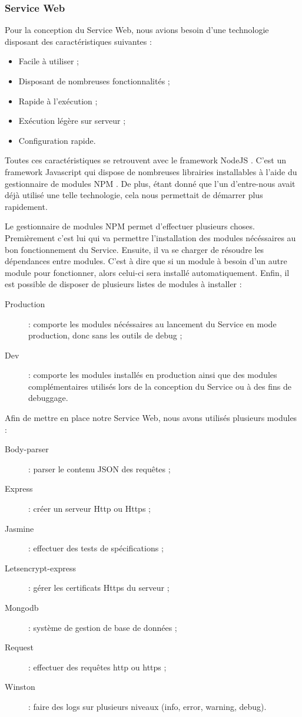 \subsubsection{Service Web}

Pour la conception du Service Web, nous avions besoin d'une technologie disposant des caractéristiques suivantes :
\begin{itemize}
    \item Facile à utiliser ;
    \item Disposant de nombreuses fonctionnalités ;
    \item Rapide à l'exécution ;
    \item Exécution légère sur serveur ;
    \item Configuration rapide.
\end{itemize}

Toutes ces caractéristiques se retrouvent avec le framework NodeJS \cite{nodejs}. C'est un framework Javascript qui dispose de nombreuses librairies installables à l'aide du gestionnaire de modules NPM \cite{npmjs}. De plus, étant donné que l'un d'entre-nous avait déjà utilisé une telle technologie, cela nous permettait de démarrer plus rapidement.

Le gestionnaire de modules NPM permet d'effectuer plusieurs choses.
Premièrement c'est lui qui va permettre l'installation des modules nécéssaires au bon fonctionnement du Service. Ensuite, il va se charger de résoudre les dépendances entre modules. C'est à dire que si un module à besoin d'un autre module pour fonctionner, alors celui-ci sera installé automatiquement.
Enfin, il est possible de disposer de plusieurs listes de modules à installer :
\begin{description}
    \item [Production] : comporte les modules nécéssaires au lancement du Service en mode production, donc sans les outils de debug ;
    \item [Dev] : comporte les modules installés en production ainsi que des modules complémentaires utilisés lors de la conception du Service ou à des fins de debuggage.
\end{description}

Afin de mettre en place notre Service Web, nous avons utilisés plusieurs modules :
\begin{description}
    \item [Body-parser] : parser le contenu JSON des requêtes ;
    \item [Express] : créer un serveur Http ou Https ;
    \item [Jasmine] : effectuer des tests de spécifications ;
    \item [Letsencrypt-express] : gérer les certificats Https du serveur ;
    \item [Mongodb] : système de gestion de base de données ;
    \item [Request] : effectuer des requêtes http ou https ;
    \item [Winston] : faire des logs sur plusieurs niveaux (info, error, warning, debug).
\end{description}

